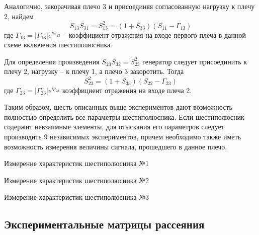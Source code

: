 Аналогично, закорачивая плечо 3 и присоединяя согласованную нагрузку к плечу 2, найдем 
\begin{equation}
	S _ { 13 } S _ { 31 } = S _ { 13 } ^ { 2 } = \left( 1 + S _ { 33 } \right) \left( S _ { 11 } - \Gamma _ { 13 } \right)
\end{equation}
где  $\Gamma _ { 13 } = \left| \Gamma _ { 13 } \right| e ^ { i \varphi _ { 13 } }$ -- коэффициент отражения на входе первого плеча в данной схеме включения шестиполюсника.

Для определения произведения $S_{23}S_{32}=S_{23}^2$ генератор следует
присоединить к плечу 2, нагрузку -- к плечу 1, а плечо 3 закоротить.
Тогда
\begin{equation}
	S _ { 23 } ^ { 2 } = \left( 1 + S _ { 33 } \right) \left( S _ { 22 } - \Gamma _ { 23 } \right)
\end{equation}
где $\Gamma _ { 23 } = \left| \Gamma _ { 23 } \right| e ^ { i p _ { 23 } }$ коэффициент отражения на входе плеча 2.

Таким образом, шесть описанных выше экспериментов дают возможность полностью определить все параметры  шестиполюсника.
Если шестиполюсник содержит невзаимные элементы, для отыскания его параметров следует производить 9 независимых экспериментов, причем необходимо также иметь возможность измерения величины сигнала, прошедшего в данное плечо.


\begin{table}[h!]
	\caption{Измерение характеристик шестиполюсника №1}
	\label{tab:1}
	\vspace{1em}
	\centering
	
\end{table}


\begin{table}[h!]
	\caption{Измерение характеристик шестиполюсника №2}
	\label{tab:2}
	\vspace{1em}
	\centering
	
\end{table}


\begin{table}[h!]
	\caption{Измерение характеристик шестиполюсника №3}
	\label{tab:3}
	\vspace{1em}
	\centering
	
\end{table}

\subsection{Экспериментальные матрицы рассеяния}

